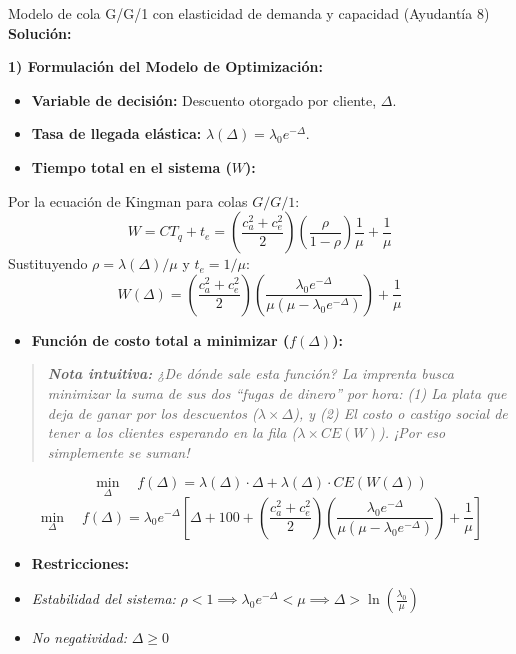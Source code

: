 \begin{ejercicio}{Modelo de cola G/G/1 con elasticidad de demanda y capacidad (Ayudantía 8)}
\textbf{Solución:}

\textbf{1) Formulación del Modelo de Optimización:}
\begin{itemize}
  \item \textbf{Variable de decisión:} Descuento otorgado por cliente, $\Delta$.
  \item \textbf{Tasa de llegada elástica:} $\lambda(\Delta) = \lambda_0 e^{-\Delta}$.
  \item \textbf{Tiempo total en el sistema ($W$):}
\end{itemize}
    Por la ecuación de Kingman para colas $G/G/1$:
    $$W = CT_q + t_e = \left( \frac{c_a^2 + c_e^2}{2} \right) \left( \frac{\rho}{1 - \rho} \right) \frac{1}{\mu} + \frac{1}{\mu}$$
    Sustituyendo $\rho = \lambda(\Delta) / \mu$ y $t_e = 1/\mu$:
    $$W(\Delta) = \left( \frac{c_a^2 + c_e^2}{2} \right) \left( \frac{\lambda_0 e^{-\Delta}}{\mu(\mu - \lambda_0 e^{-\Delta})} \right) + \frac{1}{\mu}$$
\begin{itemize}
  \item \textbf{Función de costo total a minimizar ($f(\Delta)$):}
\end{itemize}
    \begin{quotation}
    \small \textit{\textbf{Nota intuitiva:} ¿De dónde sale esta función? La imprenta busca minimizar la suma de sus dos ``fugas de dinero'' por hora: (1) La plata que deja de ganar por los descuentos ($\lambda \times \Delta$), y (2) El costo o castigo social de tener a los clientes esperando en la fila ($\lambda \times CE(W)$). ¡Por eso simplemente se suman!}
    \end{quotation}
    $$\min_{\Delta} \quad f(\Delta) = \lambda(\Delta) \cdot \Delta + \lambda(\Delta) \cdot CE(W(\Delta))$$
    $$\min_{\Delta} \quad f(\Delta) = \lambda_0 e^{-\Delta} \left[ \Delta + 100 + \left( \frac{c_a^2 + c_e^2}{2} \right) \left( \frac{\lambda_0 e^{-\Delta}}{\mu(\mu - \lambda_0 e^{-\Delta})} \right) + \frac{1}{\mu} \right]$$
\begin{itemize}
  \item \textbf{Restricciones:}
  \item \textit{Estabilidad del sistema:} $\rho < 1 \implies \lambda_0 e^{-\Delta} < \mu \implies \Delta > \ln\left( \frac{\lambda_0}{\mu} \right)$
  \item \textit{No negatividad:} $\Delta \ge 0$
\end{itemize}


\end{ejercicio}
